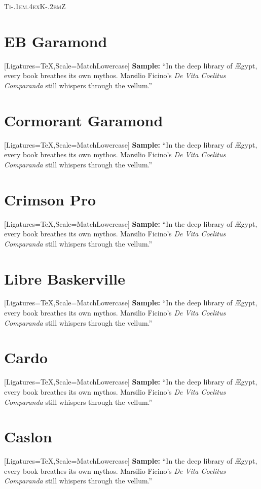 \documentclass[12pt]{article}
\newcommand{\sampletext}{%
\textbf{Sample:} “In the deep library of Ægypt, every book breathes its own mythos.%
Marsilio Ficino’s \textit{De Vita Coelitus Comparanda} still whispers through the vellum.”}
\newcommand{\tikzlogo}{%
  \textsc{Ti\kern-.1em\lower.4ex\hbox{K}\kern-.2emZ}\xspace
}
\newcommand{\monad}[2][1]{%
  \tikz[baseline=-0.5ex, scale=#1]{\pic{monad};}%
}
\begin{document}

\tikzlogo

\section*{EB Garamond}
{\setmainfont{EB Garamond}[Ligatures=TeX,Scale=MatchLowercase]
\sampletext}

\section*{Cormorant Garamond}
{\setmainfont{Cormorant Garamond}[Ligatures=TeX,Scale=MatchLowercase]
\sampletext}

\section*{Crimson Pro}
{\setmainfont{Crimson Pro}[Ligatures=TeX,Scale=MatchLowercase]
\sampletext}

\section*{Libre Baskerville}
{\setmainfont{Libre Baskerville}[Ligatures=TeX,Scale=MatchLowercase]
\sampletext}

\section*{Cardo}
{\setmainfont{Cardo}[Ligatures=TeX,Scale=MatchLowercase]
\sampletext}

\section*{Caslon}
{\setmainfont{Caslon}[Ligatures=TeX,Scale=MatchLowercase]
\sampletext}
\end{document}
